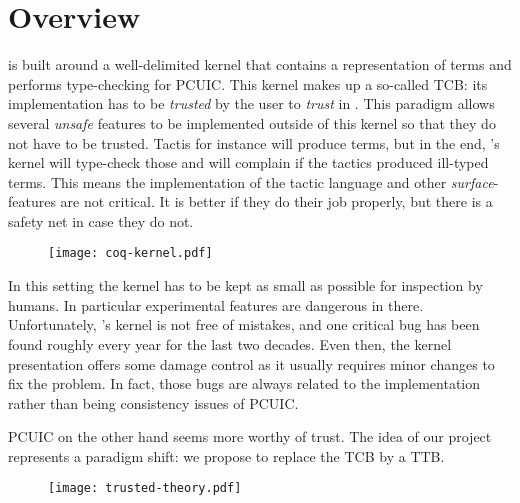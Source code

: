 \chapter{Overview}

\Coq is built around a well-delimited kernel that contains a representation of
terms and performs type-checking for \acrshort{PCUIC}.
This kernel makes up a so-called \acrlong{TCB}: its \ocaml implementation has to
be \emph{trusted} by the user to \emph{trust} in \Coq. This paradigm allows
several \emph{unsafe} features to be implemented outside of this kernel so that
they do not have to be trusted. Tactis for instance will produce terms, but in
the end, \Coq's kernel will type-check those and will complain if the tactics
produced ill-typed terms. This means the implementation of the tactic language
and other \emph{surface}-features are not critical. It is better if they do their
job properly, but there is a safety net in case they do not.
\begin{figure}[hb]
  \texttt{[image: coq-kernel.pdf]}
\end{figure}

In this setting the kernel has to be kept as small as possible for inspection
by humans. In particular experimental features are dangerous in there.
Unfortunately, \Coq's kernel is not free of mistakes, and one critical bug has
been found roughly every year for the last two decades. Even then, the kernel
presentation offers some damage control as it usually requires minor changes to
fix the problem.
In fact, those bugs are always related to the implementation rather than being
consistency issues of \acrshort{PCUIC}.

\acrshort{PCUIC} on the other hand seems more worthy of trust. The idea of our
project~ represents a paradigm shift: we propose to
replace the \acrshort{TCB} by a \acrfull{TTB}.
\begin{figure}[hb]
  \texttt{[image: trusted-theory.pdf]}
\end{figure}

